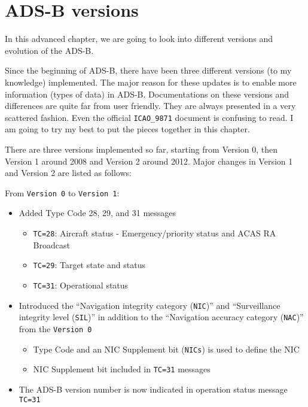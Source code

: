 \section{ADS-B versions}\label{ads-b-versions}

In this advanced chapter, we are going to look into different versions and evolution of the ADS-B.

Since the beginning of ADS-B, there have been three different versions (to my knowledge) implemented. The major reason for these updates is to enable more information (types of data) in ADS-B. Documentations on these versions and differences are quite far from user friendly. They are always presented in a very scattered fashion. Even the official \texttt{ICAO\_9871} document is confusing to read. I am going to try my best to put the pieces together in this chapter.

There are three versions implemented so far, starting from Version 0, then Version 1 around 2008 and Version 2 around 2012. Major changes in Version 1 and Version 2 are listed as follows:

From \texttt{Version\ 0} to \texttt{Version\ 1}:

\begin{itemize}
\item
  Added Type Code 28, 29, and 31 messages

  \begin{itemize}
    \item
    \texttt{TC=28}: Aircraft status - Emergency/priority status and ACAS
    RA Broadcast
  \item
    \texttt{TC=29}: Target state and status
  \item
    \texttt{TC=31}: Operational status
  \end{itemize}
\item
  Introduced the ``Navigation integrity category (\texttt{NIC})'' and   ``Surveillance integrity level (\texttt{SIL})'' in addition to the   ``Navigation accuracy category (\texttt{NAC})'' from the \texttt{Version\ 0}

  \begin{itemize}
    \item
    Type Code and an NIC Supplement bit (\texttt{NICs}) is used to
    define the NIC
  \item
    NIC Supplement bit included in \texttt{TC=31} messages
  \end{itemize}
\item
  The ADS-B version number is now indicated in operation status message
  \texttt{TC=31}
\end{itemize}

